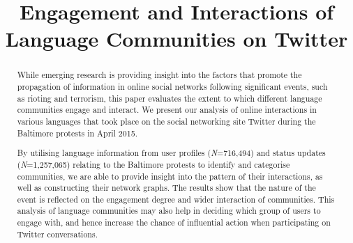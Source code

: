 \documentclass[conference]{IEEEtran}
\begin{document}
\title{Engagement and Interactions of Language Communities on Twitter}


\author{
\and
{}
\and
{}
}



\maketitle


\begin{abstract}
While emerging research is providing insight into the factors that
promote the propagation of information in online social networks
following significant events, such as rioting and terrorism, this
paper evaluates the extent to which different language communities
engage and interact. We present our analysis of online interactions in
various languages that took place on the social networking site
Twitter during the Baltimore protests in April 2015.

By utilising language information from user profiles
({\emph{N}}=716,494) and status updates ({\emph{N}}=1,257,065)
relating to the Baltimore protests to identify and categorise
communities, we are able to provide insight into the pattern of their
interactions, as well as constructing their network graphs. The
results show that the nature of the event is reflected on the
engagement degree and wider interaction of communities. This analysis
of language communities may also help in deciding which group of users
to engage with, and hence increase the chance of influential action
when participating on Twitter conversations.
\end{abstract}
\end{document}
